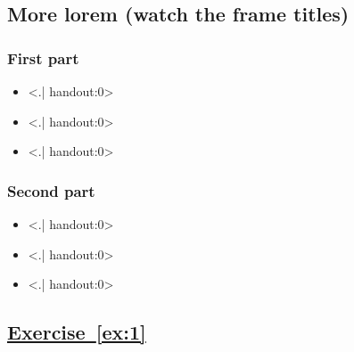   \subsection{More lorem (watch the frame titles)}

  \subsubsection{First part}

  \begin{frame}{\framesectiontitle}{\framesectionsubtitle}
    \begin{itemize}[<+->] \footnotesize
      \item \alert<.| handout:0>{\lipsumgetsentence[26]}
      \item \alert<.| handout:0>{\lipsumgetsentence[27]}
      \item \alert<.| handout:0>{\lipsumgetsentence[28]}
    \end{itemize}
  \end{frame}

  \subsubsection{Second part}

  \begin{frame}{\framesectiontitle}{\framesectionsubtitle}
    \begin{itemize}[<+->] \footnotesize
      \item \alert<.| handout:0>{\lipsumgetsentence[33]}
      \item \alert<.| handout:0>{\lipsumgetsentence[34]}
      \item \alert<.| handout:0>{\lipsumgetsentence[35]}
    \end{itemize}
  \end{frame}

  \subsection{\texorpdfstring{\hyperref[ex:1]{Exercise~\protect\ref*{ex:1}}}{Exercise~\protect\ref*{ex:1}}}

